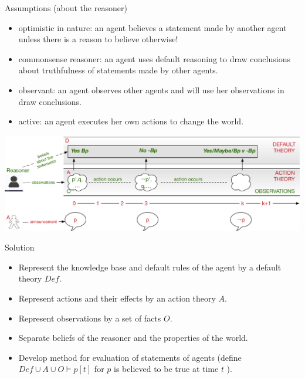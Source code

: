 \documentclass[unknownkeysallowed]{beamer}
\begin{document}
\begin{frame}{}  


\begin{block}{Assumptions (about the reasoner)} 
\begin{itemize}  
\vspace{-2pt}
\item \alert{optimistic in nature}: an agent believes a statement made by   another agent unless  there is a reason to believe otherwise!   
\vspace{-2pt}
\item \alert{commonsense reasoner}:  an agent uses default reasoning to draw  conclusions about truthfulness of statements made by other agents. 
\vspace{-2pt}
\item \alert{observant}:  an agent observes other agents and will use her observations in draw conclusions.
\vspace{-2pt}
\item \alert{active}:  an agent executes her own actions to change the world.
\end{itemize}  
\end{block} 

\end{frame} 
  

\begin{frame}{} 

\includegraphics[width=0.95\linewidth]{framework.pdf}
 

\begin{block}{Solution} 
\begin{itemize}  
\vspace{-2pt}
\item Represent the knowledge base and default rules of the agent by a default theory  $\mathit{Def}$. 
\vspace{-2pt}
\item Represent actions and their effects by an action theory  $A$.
\vspace{-2pt}
\item Represent observations by a set of facts $O$. 
\vspace{-2pt}
\item Separate beliefs of the reasoner and the properties of the world. 
\vspace{-2pt}
\item Develop method for evaluation of statements of agents (define $\mathit{Def} \cup A \cup O \models p[t]$ for $p$ is believed to be true at time $t$ ). 
\end{itemize}  
\end{block} 
 
\end{frame} 
  
\end{document}

